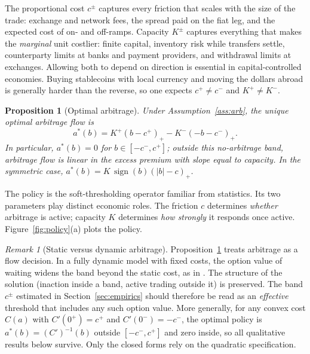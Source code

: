 \documentclass[12pt]{article}
\newtheorem{proposition}{Proposition}
\theoremstyle{definition}
\theoremstyle{remark}
\newtheorem{remark}{Remark}
\newcommand{\sgn}{\operatorname{sign}}
\newcommand{\pos}[1]{\left(#1\right)_+}
\begin{document}
The proportional cost $c^\pm$ captures every friction that scales with the size of the trade: exchange and network fees, the spread paid on the fiat leg, and the expected cost of on- and off-ramps. Capacity $K^\pm$ captures everything that makes the \emph{marginal} unit costlier: finite capital, inventory risk while transfers settle, counterparty limits at banks and payment providers, and withdrawal limits at exchanges. Allowing both to depend on direction is essential in capital-controlled economies. Buying stablecoins with local currency and moving the dollars abroad is generally harder than the reverse, so one expects $c^+\neq c^-$ and $K^+\neq K^-$.

\begin{proposition}[Optimal arbitrage]\label{prop:policy}
Under Assumption~\ref{ass:arb}, the unique optimal arbitrage flow is
\begin{equation}\label{eq:policy}
a^*(b) = K^+\pos{b-c^+} - K^-\pos{-b-c^-}.
\end{equation}
In particular, $a^*(b)=0$ for $b\in[-c^-,c^+]$; outside this \emph{no-arbitrage band}, arbitrage flow is linear in the excess premium with slope equal to capacity. In the symmetric case, $a^*(b)=K\,\sgn(b)\pos{|b|-c}$.
\end{proposition}

The policy is the soft-thresholding operator familiar from statistics. Its two parameters play distinct economic roles. The friction $c$ determines \emph{whether} arbitrage is active; capacity $K$ determines \emph{how strongly} it responds once active. Figure~\ref{fig:policy}(a) plots the policy.

\begin{remark}[Static versus dynamic arbitrage]
Proposition~\ref{prop:policy} treats arbitrage as a flow decision. In a fully dynamic model with fixed costs, the option value of waiting widens the band beyond the static cost, as in \citet{dumas1992dynamic}. The structure of the solution (inaction inside a band, active trading outside it) is preserved. The band $c^\pm$ estimated in Section~\ref{sec:empirics} should therefore be read as an \emph{effective} threshold that includes any such option value. More generally, for any convex cost $C(a)$ with $C'(0^+)=c^+$ and $C'(0^-)=-c^-$, the optimal policy is $a^*(b)=(C')^{-1}(b)$ outside $[-c^-,c^+]$ and zero inside, so all qualitative results below survive. Only the closed forms rely on the quadratic specification.
\end{remark}
\end{document}
